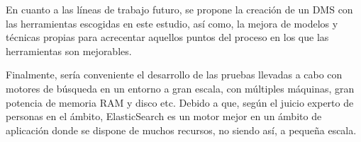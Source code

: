 \documentclass[runningheads,a4paper]{llncs}
\theoremstyle{break}
\begin{document}
En cuanto a las líneas de trabajo futuro, se propone la creación de un DMS con las herramientas escogidas en este estudio, así como, la mejora de modelos y técnicas propias para acrecentar aquellos puntos del proceso en los que las herramientas son mejorables.

Finalmente, sería conveniente el desarrollo de las pruebas llevadas a cabo con motores de búsqueda en un entorno a gran escala, con múltiples máquinas, gran potencia de memoria RAM y disco etc. Debido a que, según el juicio experto de personas en el ámbito, ElasticSearch es un motor mejor en un ámbito de aplicación donde se dispone de muchos recursos, no siendo así, a pequeña escala.

\end{document}
